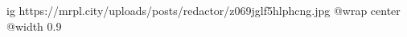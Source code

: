  
 
 
 
 

\ifcmt
  ig https://mrpl.city/uploads/posts/redactor/z069jglf5hlphcng.jpg
  @wrap center
  @width 0.9
\fi
